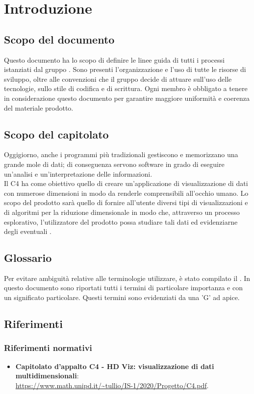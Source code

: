 \section{Introduzione}
\subsection{Scopo del documento}
Questo documento ha lo scopo di definire le linee guida di tutti i processi istanziati dal gruppo \Gruppo{}. Sono presenti l'organizzazione e l'uso di tutte le risorse di sviluppo, oltre alle convenzioni che il gruppo decide di attuare sull'uso delle tecnologie, sullo stile di codifica e di scrittura. Ogni membro è obbligato a tenere in considerazione questo documento per garantire maggiore uniformità e coerenza del materiale prodotto.

\subsection{Scopo del capitolato}
Oggigiorno, anche i programmi più tradizionali gestiscono e memorizzano una grande mole di dati; di conseguenza servono software in grado di eseguire un'analisi e un'interpretazione delle informazioni.\\
Il  C4 ha come obiettivo quello di creare un'applicazione di visualizzazione di dati con numerose dimensioni in modo da renderle comprensibili all'occhio umano.  Lo scopo del prodotto sarà quello di fornire all'utente diversi tipi di visualizzazioni e di algoritmi per la riduzione dimensionale in modo che, attraverso un processo esplorativo, l'utilizzatore del prodotto possa studiare tali dati ed evidenziarne degli eventuali . 

\subsection{Glossario}
Per evitare ambiguità relative alle terminologie utilizzare, è stato compilato il . In questo documento sono riportati tutti i termini di particolare importanza e con un significato particolare. Questi termini sono evidenziati da una 'G' ad apice.

\subsection{Riferimenti}
\subsubsection{Riferimenti normativi}
\begin{itemize}	
	\item \textbf{Capitolato d'appalto C4 - HD Viz: visualizzazione di dati multidimensionali}:\\
	\textcolor{blue}{\url{https://www.math.unipd.it/~tullio/IS-1/2020/Progetto/C4.pdf}}.
\end{itemize}

